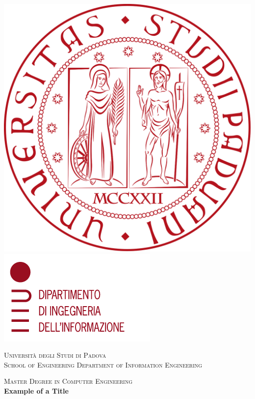 \documentclass[a4paper,12pt]{report}
\begin{document}
\begin{titlepage}
\begin{center}

\includegraphics[height=0.13\textheight]{logo_unipd.png}
\hfill
\includegraphics[height=0.13\textheight]{logo_dei.png}
\newline
\newline

\vspace{0.8cm}
\textsc{\LARGE Universit\`{a} degli Studi di Padova}\\
\vspace{1.6cm}
\textsc{\large 	School of Engineering Department of Information Engineering}\\
\vspace{0.4cm}

\textsc{\large Master Degree in Computer Engineering}\\
\vfill
{ \LARGE \bfseries Example of a Title}\\
\vspace{1cm}


\end{center}
\end{titlepage}
\end{document}
